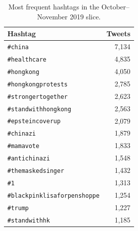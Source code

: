 \begin{table}[t]
\centering
\caption{Most frequent hashtags in the October--November 2019 slice.}
\label{tab:top-hashtags}
\begin{tabular}{lr}
\toprule
Hashtag & Tweets \\
\midrule
\texttt{\#china} & 7,134 \\
\texttt{\#healthcare} & 4,835 \\
\texttt{\#hongkong} & 4,050 \\
\texttt{\#hongkongprotests} & 2,785 \\
\texttt{\#strongertogether} & 2,623 \\
\texttt{\#standwithhongkong} & 2,563 \\
\texttt{\#epsteincoverup} & 2,079 \\
\texttt{\#chinazi} & 1,879 \\
\texttt{\#mamavote} & 1,833 \\
\texttt{\#antichinazi} & 1,548 \\
\texttt{\#themaskedsinger} & 1,432 \\
\texttt{\#1} & 1,313 \\
\texttt{\#blackpinklisaforpenshoppe} & 1,254 \\
\texttt{\#trump} & 1,227 \\
\texttt{\#standwithhk} & 1,185 \\
\bottomrule
\end{tabular}
\end{table}
